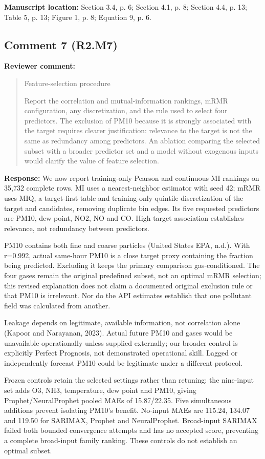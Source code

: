 \documentclass[11pt,a4paper]{article}
\begin{document}
\textbf{Manuscript location:} Section 3.4, p. 6; Section 4.1, p. 8; Section 4.4, p. 13; Table 5, p. 13; Figure 1, p. 8; Equation 9, p. 6.
\begin{samepage}
\subsection*{Comment 7 (R2.M7)}
\textbf{Reviewer comment:}
\begin{quote}\small Feature-selection procedure

Report the correlation and mutual-information rankings, mRMR configuration, any discretization, and the rule used to select four predictors. The exclusion of PM10 because it is strongly associated with the target requires clearer justification: relevance to the target is not the same as redundancy among predictors. An ablation comparing the selected subset with a broader predictor set and a model without exogenous inputs would clarify the value of feature selection.\end{quote}
\end{samepage}
\textbf{Response:}
We now report training-only Pearson and continuous MI rankings on 35,732 complete rows. MI uses a nearest-neighbor estimator with seed 42; mRMR uses MIQ, a target-first table and training-only quintile discretization of the target and candidates, removing duplicate bin edges. Its five requested predictors are PM10, dew point, NO2, NO and CO. High target association establishes relevance, not redundancy between predictors.

PM10 contains both fine and coarse particles (United States EPA, n.d.). With r=0.992, actual same-hour PM10 is a close target proxy containing the fraction being predicted. Excluding it keeps the primary comparison gas-conditioned. The four gases remain the original predefined subset, not an optimal mRMR selection; this revised explanation does not claim a documented original exclusion rule or that PM10 is irrelevant. Nor do the API estimates establish that one pollutant field was calculated from another.

Leakage depends on legitimate, available information, not correlation alone (Kapoor and Narayanan, 2023). Actual future PM10 and gases would be unavailable operationally unless supplied externally; our broader control is explicitly Perfect Prognosis, not demonstrated operational skill. Lagged or independently forecast PM10 could be legitimate under a different protocol.

Frozen controls retain the selected settings rather than retuning: the nine-input set adds O3, NH3, temperature, dew point and PM10, giving Prophet/NeuralProphet pooled MAEs of 15.87/22.35. Five simultaneous additions prevent isolating PM10's benefit. No-input MAEs are 115.24, 134.07 and 119.50 for SARIMAX, Prophet and NeuralProphet. Broad-input SARIMAX failed both bounded convergence attempts and has no accepted score, preventing a complete broad-input family ranking. These controls do not establish an optimal subset.
\end{document}
